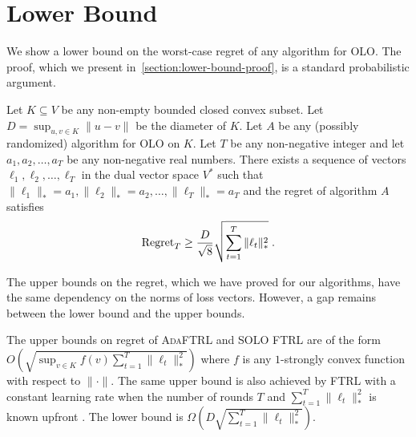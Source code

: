 \section{Lower Bound}
\label{section:lower-bound}

We show a lower bound on the worst-case regret of any algorithm for OLO. The
proof, which we present in~\ref{section:lower-bound-proof}, is a standard
probabilistic argument.

\begin{theorem}
\label{theorem:simple-lower-bound}
Let $K \subseteq V$ be any non-empty bounded closed convex subset. Let $D =
\sup_{u,v \in K} \|u - v\|$ be the diameter of $K$. Let $A$ be any (possibly
randomized) algorithm for OLO on $K$. Let $T$ be any non-negative integer and
let $a_1, a_2, \dots, a_T$ be any non-negative real numbers.  There exists a
sequence of vectors $\ell_1, \ell_2, \dots, \ell_T$ in the dual vector space
$V^*$ such that $\|\ell_1\|_* = a_1, \|\ell_2\|_* = a_2, \dots, \|\ell_T\|_* =
a_T$ and the regret of algorithm $A$ satisfies
\begin{equation}
\label{equation:simple-lower-bound}
\operatorname{Regret}_T \ge \frac{D}{\sqrt{8}} \sqrt{\sum_{t=1}^T\|\ell_t\|_*^2} \; .
\end{equation}
\end{theorem}

The upper bounds on the regret, which we have proved for our algorithms, have
the same dependency on the norms of loss vectors.  However, a gap remains
between the lower bound and the upper bounds.

The upper bounds on regret of \textsc{AdaFTRL} and \textsc{SOLO FTRL} are of
the form $O(\sqrt{\sup_{v \in K} f(v) \sum_{t=1}^T \|\ell_t\|_*^2})$ where $f$
is any $1$-strongly convex function with respect to $\|\cdot\|$.  The same
upper bound is also achieved by \textsc{FTRL} with a constant learning rate
when the number of rounds $T$ and $\sum_{t=1}^T \|\ell_t\|_*^2$ is known
upfront \cite[Chapter 2]{Shalev-Shwartz-2011}.  The lower bound is
$\Omega(D\sqrt{\sum_{t=1}^T \|\ell_t\|_*^2})$.

